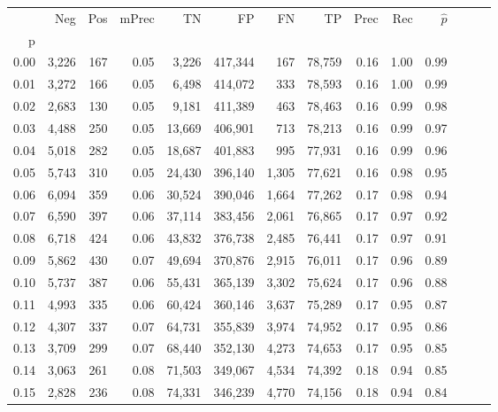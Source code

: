 \begin{tabular}{rrrrrrrrrrrrrr}
\toprule
{} &    Neg &    Pos & mPrec &       TN &       FP &      FN &      TP &  Prec &   Rec & $\hat{p}$ \\
p    &        &        &       &          &          &         &         &       &       &           \\
\midrule
0.00 &  3,226 &    167 &  0.05 &    3,226 &  417,344 &     167 &  78,759 &  0.16 &  1.00 &      0.99 \\
0.01 &  3,272 &    166 &  0.05 &    6,498 &  414,072 &     333 &  78,593 &  0.16 &  1.00 &      0.99 \\
0.02 &  2,683 &    130 &  0.05 &    9,181 &  411,389 &     463 &  78,463 &  0.16 &  0.99 &      0.98 \\
0.03 &  4,488 &    250 &  0.05 &   13,669 &  406,901 &     713 &  78,213 &  0.16 &  0.99 &      0.97 \\
0.04 &  5,018 &    282 &  0.05 &   18,687 &  401,883 &     995 &  77,931 &  0.16 &  0.99 &      0.96 \\
0.05 &  5,743 &    310 &  0.05 &   24,430 &  396,140 &   1,305 &  77,621 &  0.16 &  0.98 &      0.95 \\
0.06 &  6,094 &    359 &  0.06 &   30,524 &  390,046 &   1,664 &  77,262 &  0.17 &  0.98 &      0.94 \\
0.07 &  6,590 &    397 &  0.06 &   37,114 &  383,456 &   2,061 &  76,865 &  0.17 &  0.97 &      0.92 \\
0.08 &  6,718 &    424 &  0.06 &   43,832 &  376,738 &   2,485 &  76,441 &  0.17 &  0.97 &      0.91 \\
0.09 &  5,862 &    430 &  0.07 &   49,694 &  370,876 &   2,915 &  76,011 &  0.17 &  0.96 &      0.89 \\
0.10 &  5,737 &    387 &  0.06 &   55,431 &  365,139 &   3,302 &  75,624 &  0.17 &  0.96 &      0.88 \\
0.11 &  4,993 &    335 &  0.06 &   60,424 &  360,146 &   3,637 &  75,289 &  0.17 &  0.95 &      0.87 \\
0.12 &  4,307 &    337 &  0.07 &   64,731 &  355,839 &   3,974 &  74,952 &  0.17 &  0.95 &      0.86 \\
0.13 &  3,709 &    299 &  0.07 &   68,440 &  352,130 &   4,273 &  74,653 &  0.17 &  0.95 &      0.85 \\
0.14 &  3,063 &    261 &  0.08 &   71,503 &  349,067 &   4,534 &  74,392 &  0.18 &  0.94 &      0.85 \\
0.15 &  2,828 &    236 &  0.08 &   74,331 &  346,239 &   4,770 &  74,156 &  0.18 &  0.94 &      0.84 \\

\end{tabular}

